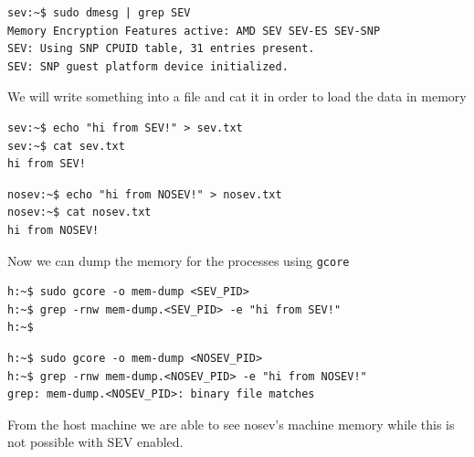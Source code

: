\documentclass[twocolumn]{article}
\begin{document}
\begin{verbatim}
sev:~$ sudo dmesg | grep SEV
Memory Encryption Features active: AMD SEV SEV-ES SEV-SNP
SEV: Using SNP CPUID table, 31 entries present.
SEV: SNP guest platform device initialized.
\end{verbatim}

We will write something into a file and cat it in order to load the data in memory

\begin{verbatim}
sev:~$ echo "hi from SEV!" > sev.txt
sev:~$ cat sev.txt
hi from SEV!
\end{verbatim}

\begin{verbatim}
nosev:~$ echo "hi from NOSEV!" > nosev.txt
nosev:~$ cat nosev.txt
hi from NOSEV!
\end{verbatim}

Now we can dump the memory for the processes using \texttt{gcore}

\begin{verbatim}
h:~$ sudo gcore -o mem-dump <SEV_PID>
h:~$ grep -rnw mem-dump.<SEV_PID> -e "hi from SEV!"
h:~$
\end{verbatim}

\begin{verbatim}
h:~$ sudo gcore -o mem-dump <NOSEV_PID>
h:~$ grep -rnw mem-dump.<NOSEV_PID> -e "hi from NOSEV!"
grep: mem-dump.<NOSEV_PID>: binary file matches
\end{verbatim}

From the host machine we are able to see nosev's machine memory while this is not possible with SEV enabled.
\end{document}
